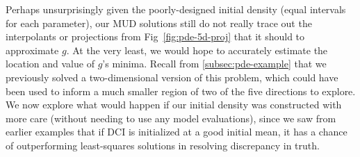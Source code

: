 Perhaps unsurprisingly given the poorly-designed initial density (equal intervals for each parameter), our MUD solutions still do not really trace out the interpolants or projections from Fig~\ref{fig:pde-5d-proj} that it should to approximate $g$.
At the very least, we would hope to accurately estimate the location and value of $g$'s minima.
Recall from \ref{subsec:pde-example} that we previously solved a two-dimensional version of this problem, which could have been used to inform a much smaller region of two of the five directions to explore.
We now explore what would happen if our initial density was constructed with more care (without needing to use any model evaluations), since we saw from earlier examples that if DCI is initialized at a good initial mean, it has a chance of outperforming least-squares solutions in resolving discrepancy in truth.
